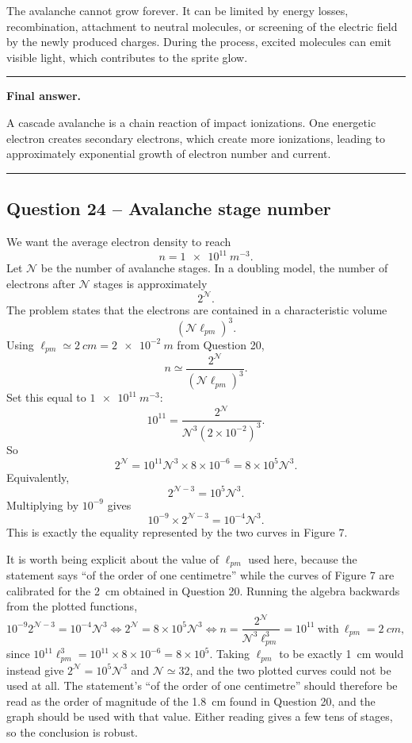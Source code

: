 \documentclass[11pt,a4paper]{article}
\newenvironment{finalanswer}{%
  \begin{center}\begin{minipage}{0.94\linewidth}\hrule\vspace{0.45em}\textbf{Final answer. }%
}{%
  \vspace{0.45em}\hrule\end{minipage}\end{center}%
}
\begin{document}
The avalanche cannot grow forever. It can be limited by energy losses, recombination, attachment to neutral molecules, or screening of the electric field by the newly produced charges. During the process, excited molecules can emit visible light, which contributes to the sprite glow.

\begin{finalanswer}
A cascade avalanche is a chain reaction of impact ionizations. One energetic electron creates secondary electrons, which create more ionizations, leading to approximately exponential growth of electron number and current.
\end{finalanswer}

\subsection*{Question 24 -- Avalanche stage number}

We want the average electron density to reach
\[
 n=\SI{1e11}{m^{-3}}.
\]
Let $\mathcal{N}$ be the number of avalanche stages. In a doubling model, the number of electrons after $\mathcal{N}$ stages is approximately
\[
 2^{\mathcal{N}}.
\]
The problem states that the electrons are contained in a characteristic volume
\[
 (\mathcal{N}\ell_{pm})^3.
\]
Using $\ell_{pm}\simeq\SI{2}{cm}=\SI{2e-2}{m}$ from Question 20,
\[
 n\simeq\frac{2^{\mathcal{N}}}{(\mathcal{N}\ell_{pm})^3}.
\]
Set this equal to $\SI{1e11}{m^{-3}}$:
\[
 10^{11}=\frac{2^{\mathcal{N}}}{\mathcal{N}^3(2\times10^{-2})^3}.
\]
So
\[
 2^{\mathcal{N}}=10^{11}\mathcal{N}^3\times8\times10^{-6}
 =8\times10^5\mathcal{N}^3.
\]
Equivalently,
\[
 2^{\mathcal{N}-3}=10^5\mathcal{N}^3.
\]
Multiplying by $10^{-9}$ gives
\[
 10^{-9}\times 2^{\mathcal{N}-3}=10^{-4}\mathcal{N}^3.
\]
This is exactly the equality represented by the two curves in Figure 7.

It is worth being explicit about the value of $\ell_{pm}$ used here, because the
statement says ``of the order of one centimetre'' while the curves of Figure 7
are calibrated for the \SI{2}{cm} obtained in Question 20. Running the algebra
backwards from the plotted functions,
\[
 10^{-9}2^{\mathcal{N}-3}=10^{-4}\mathcal{N}^3
 \iff
 2^{\mathcal{N}}=8\times10^{5}\mathcal{N}^3
 \iff
 n=\frac{2^{\mathcal{N}}}{\mathcal{N}^3\ell_{pm}^3}=10^{11}
 \ \text{with}\ \ell_{pm}=\SI{2}{cm},
\]
since $10^{11}\ell_{pm}^3=10^{11}\times8\times10^{-6}=8\times10^{5}$. Taking
$\ell_{pm}$ to be exactly \SI{1}{cm} would instead give
$2^{\mathcal{N}}=10^{5}\mathcal{N}^3$ and $\mathcal{N}\simeq32$, and the two
plotted curves could not be used at all. The statement's ``of the order of one
centimetre'' should therefore be read as the order of magnitude of the
\SI{1.8}{cm} found in Question 20, and the graph should be used with that value.
Either reading gives a few tens of stages, so the conclusion is robust.
\end{document}
